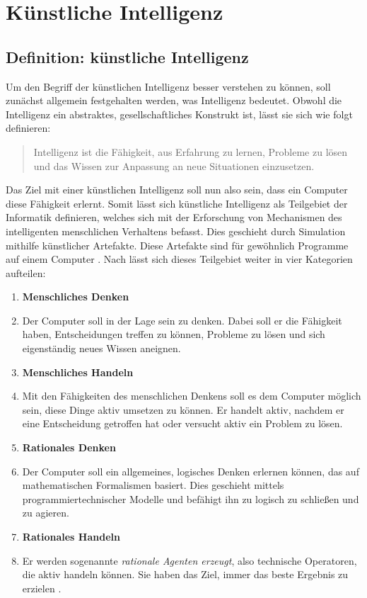 \chapter{Künstliche Intelligenz}
\thispagestyle{fancy}
\section{Definition: künstliche Intelligenz}
Um den Begriff der künstlichen Intelligenz besser verstehen zu können, soll zunächst allgemein festgehalten werden, was Intelligenz bedeutet. Obwohl die Intelligenz ein abstraktes, gesellschaftliches Konstrukt ist, lässt sie sich wie folgt definieren:

\begin{quote}
\glqq  Intelligenz ist die Fähigkeit, aus Erfahrung zu lernen, Probleme zu lösen und das Wissen zur Anpassung an neue Situationen einzusetzen.\grqq{} \parencite[S. 400]{psychologie}
\end{quote}

Das Ziel mit einer künstlichen Intelligenz soll nun also sein, dass ein Computer diese Fähigkeit erlernt. Somit lässt sich künstliche Intelligenz als Teilgebiet der Informatik definieren, welches sich mit der Erforschung von Mechanismen des intelligenten menschlichen Verhaltens befasst. Dies geschieht durch Simulation mithilfe künstlicher Artefakte. Diese Artefakte sind für gewöhnlich Programme auf einem Computer \parencite[]{wichert}. Nach \citet[23]{russell2012knstliche} lässt sich dieses Teilgebiet weiter in vier Kategorien aufteilen:\\

\begin{enumerate}
    \item \textbf{Menschliches Denken}
    \item[] Der Computer soll in der Lage sein zu denken. Dabei soll er die Fähigkeit haben, Entscheidungen treffen zu können, Probleme zu lösen und sich eigenständig neues Wissen aneignen.
    
    \item \textbf{Menschliches Handeln}
    \item[] Mit den Fähigkeiten des menschlichen Denkens soll es dem Computer möglich sein, diese Dinge aktiv umsetzen zu können. Er handelt aktiv, nachdem er eine Entscheidung getroffen hat oder versucht aktiv ein Problem zu lösen.
    
    \item \textbf{Rationales Denken}
    \item[] Der Computer soll ein allgemeines, logisches Denken erlernen können, das auf mathematischen Formalismen basiert. Dies geschieht mittels programmiertechnischer Modelle und befähigt ihn zu logisch zu schließen und zu agieren.
    
    \item \textbf{Rationales Handeln}
    \item[] Er werden sogenannte \textit{rationale Agenten erzeugt}, also technische Operatoren, die aktiv handeln können. Sie haben das Ziel, immer das beste Ergebnis zu erzielen \parencite[S. 25]{russell2012knstliche}.
\end{enumerate}


